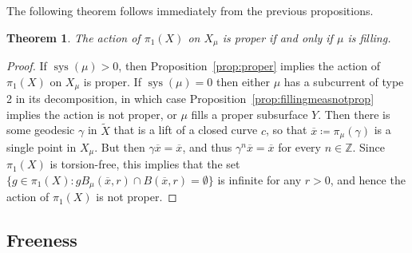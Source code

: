 \documentclass[12pt,article]{amsart}
\numberwithin{equation}{section}
\numberwithin{figure}{section}
\newtheorem{theorem}[equation]{Theorem}
\theoremstyle{definition}
\theoremstyle{plain}
\DeclareMathOperator{\sys}{sys}
\newcommand*{\wt}[1]{\widetilde{#1}}
\begin{document}
The following theorem follows immediately from the previous propositions.



\begin{theorem}
\label{thm:proper_for_filling}
The action of $\pi_1(X)$ on $X_{\mu}$ is proper if and only if $\mu$ is filling.
\end{theorem}
\begin{proof}
If $\sys(\mu)>0$, then Proposition~\ref{prop:proper} implies the action of $\pi_1(X)$ on $X_{\mu}$ is proper.
If $\sys(\mu)=0$ then either $\mu$ has a subcurrent of type 2 in its decomposition, in which case Proposition~\ref{prop:fillingmeasnotprop} implies the action is not proper, or $\mu$ fills a proper subsurface $Y$.
Then there is some geodesic $\gamma$ in $\wt{X}$ that is a lift of a closed curve $c$, so that $\overline{x} \coloneqq \pi_{\mu}(\gamma)$ is a single point in $X_{\mu}$. But then $\gamma \overline{x} = \overline{x}$, and thus $\gamma^n \overline{x} = \overline{x}$ for every $n \in \mathbb{Z}$. Since $\pi_1(X)$ is torsion-free, this implies that the set $\{g \in \pi_1(X) : g B_{\mu}(\overline{x},r) \cap B(\overline{x},r) = \emptyset \}$ is infinite for any $r>0$, and hence the action of $\pi_1(X)$ is not proper.
\end{proof}

\subsection{Freeness}
\end{document}
